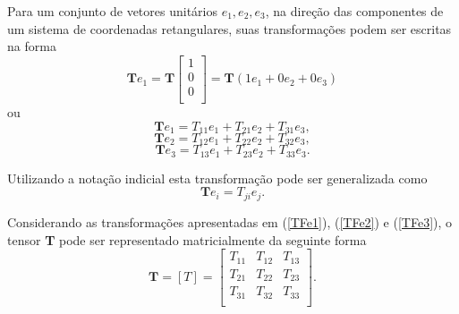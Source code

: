Para um conjunto de vetores unitários $ e_{1}, e_{2}, e_{3} $, na direção das componentes de um sistema de coordenadas retangulares, suas transformações podem ser escritas na forma
\begin{equation}
	\textbf{T} e_{1} = \textbf{T} \left[ 
	\begin{array}{c}
		1\\
		0\\
		0\\
	\end{array}
	\right] = \textbf{T} (1 e_{1} + 0 e_{2} + 0 e_{3}) 
\end{equation} 
ou
\begin{equation} \label{TFe1}
	\textbf{T} e_{1} = T_{11} e_{1} + T_{21} e_{2} + T_{31} e_{3},
\end{equation}
\begin{equation} \label{TFe2}
	\textbf{T} e_{2} = T_{12} e_{1} + T_{22} e_{2} + T_{32} e_{3},
\end{equation}
\begin{equation}\label{TFe3}
	\textbf{T} e_{3} = T_{13} e_{1} + T_{23} e_{2} + T_{33} e_{3}.
\end{equation}

Utilizando a notação indicial esta transformação pode ser generalizada como
\begin{equation} \label{indicialT}
	\textbf{T} e_{i} = T_{ji} e_{j}.
\end{equation}

Considerando as transformações apresentadas em (\ref{TFe1}), (\ref{TFe2}) e (\ref{TFe3}), o tensor \textbf{T} pode ser representado matricialmente da seguinte forma
\begin{equation} \label{matrizT}
	\textbf{T} = [T] =  \left[ 
	\begin{array}{ccc}
		T_{11} & T_{12} & T_{13} \\
		T_{21} & T_{22} & T_{23} \\
		T_{31} & T_{32} & T_{33} \\
	\end{array}
	\right].  
\end{equation} 

